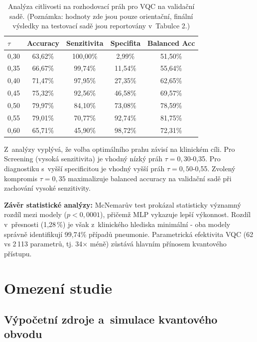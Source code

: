 \documentclass[12pt, a4paper]{report}
\begin{document}
\begin{table}[htbp]
    \centering
    \caption{Analýza citlivosti na rozhodovací práh pro VQC na validační sadě. (Poznámka: hodnoty zde jsou pouze orientační, finální výsledky na testovací sadě jsou reportovány v~Tabulce 2.)}
    \label{tab:threshold_sensitivity}
    \begin{tabular}{|l|c|c|c|c|}
        \hline
        \textbf{$\tau$} & \textbf{Accuracy} & \textbf{Senzitivita} & \textbf{Specifita} & \textbf{Balanced Acc} \\
        \hline
        0{,}30 & 63{,}62\% & 100{,}00\% & 2{,}99\% & 51{,}50\% \\ \hline
        0{,}35 & 66{,}67\% & 99{,}74\% & 11{,}54\% & 55{,}64\% \\ \hline
        0{,}40 & 71{,}47\% & 97{,}95\% & 27{,}35\% & 62{,}65\% \\ \hline
        0{,}45 & 75{,}32\% & 92{,}56\% & 46{,}58\% & 69{,}57\% \\ \hline
        0{,}50 & 79{,}97\% & 84{,}10\% & 73{,}08\% & 78{,}59\% \\ \hline
        0{,}55 & 79{,}01\% & 70{,}77\% & 92{,}74\% & 81{,}75\% \\ \hline
        0{,}60 & 65{,}71\% & 45{,}90\% & 98{,}72\% & 72{,}31\% \\
    \end{tabular}
\end{table}

Z~analýzy vyplývá, že volba optimálního prahu závisí na klinickém cíli. Pro Screening (vysoká senzitivita) je vhodný nízký práh $\tau = 0{,}30$-0{,}35. Pro diagnostiku s~vyšší specificitou je vhodný vyšší práh $\tau = 0{,}50$-0{,}55. Zvolený kompromis $\tau = 0{,}35$ maximalizuje balanced accuracy na validační sadě při zachování vysoké senzitivity.

\textbf{Závěr statistické analýzy:} McNemarův test prokázal statisticky významný rozdíl mezi modely ($p < 0{,}0001$), přičemž MLP vykazuje lepší výkonnost. Rozdíl v~přesnosti (1,28\,\%) je však z~klinického hlediska minimální - oba modely správně identifikují 99,74\% případů pneumonie. Parametrická efektivita VQC (62 vs 2\,113 parametrů, tj. 34× méně) zůstává hlavním přínosem kvantového přístupu.

\section{Omezení studie} \label{sec:omezeni}

\subsection{Výpočetní zdroje a~simulace kvantového obvodu}
\end{document}

